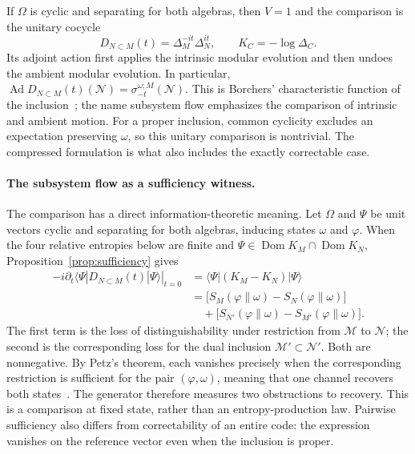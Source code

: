 \documentclass[a4paper,11pt]{article}
\theoremstyle{definition}
\begin{document}
If $\Omega$ is cyclic and separating for both algebras, then $V=1$ and the comparison is the unitary cocycle
\begin{equation}
 D_{N\subset M}(t)=\Delta_M^{-it}\Delta_N^{it},
 \qquad K_C=-\log\Delta_C.
 \label{eq:intro-subsystem-flow}
\end{equation}
Its adjoint action first applies the intrinsic modular evolution and then undoes the ambient modular evolution. In particular,
$\operatorname{Ad}D_{N\subset M}(t)(\mathcal N)=\sigma^{\omega;M}_{-t}(\mathcal N)$.
This is Borchers' characteristic function of the inclusion~\cite{revolutionizing}; the name subsystem flow emphasizes the comparison of intrinsic and ambient motion. For a proper inclusion, common cyclicity excludes an expectation preserving $\omega$, so this unitary comparison is nontrivial. The compressed formulation is what also includes the exactly correctable case.

\paragraph{The subsystem flow as a sufficiency witness.}
The comparison has a direct information-theoretic meaning. Let $\Omega$ and $\Psi$ be unit vectors cyclic and separating for both algebras, inducing states $\omega$ and $\varphi$. When the four relative entropies below are finite and $\Psi\in\operatorname{Dom}K_M\cap\operatorname{Dom}K_N$, Proposition~\ref{prop:sufficiency} gives
\begin{align}
 -i\left.\partial_t\langle\Psi|D_{N\subset M}(t)|\Psi\rangle\right|_{t=0}
 &=\langle\Psi|(K_M-K_N)|\Psi\rangle\nonumber\\
 &=\bigl[S_M(\varphi\|\omega)-S_N(\varphi\|\omega)\bigr]\nonumber\\
 &\quad+\bigl[S_{N'}(\varphi\|\omega)-S_{M'}(\varphi\|\omega)\bigr].
 \label{eq:intro-entropy}
\end{align}
The first term is the loss of distinguishability under restriction from $\mathcal M$ to $\mathcal N$; the second is the corresponding loss for the dual inclusion $\mathcal M'\subset\mathcal N'$. Both are nonnegative. By Petz's theorem, each vanishes precisely when the corresponding restriction is sufficient for the pair $(\varphi,\omega)$, meaning that one channel recovers both states~\cite{Petz1986,Petz1988}. The generator therefore measures two obstructions to recovery. This is a comparison at fixed state, rather than an entropy-production law. Pairwise sufficiency also differs from correctability of an entire code: the expression vanishes on the reference vector even when the inclusion is proper.
\end{document}
